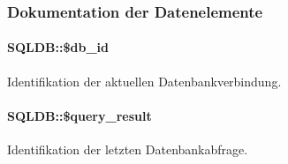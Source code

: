 \subsubsection{Dokumentation der Datenelemente}
\hypertarget{classSQLDB_2c62843044a6ec53ad3384fb36aa811b}{
\paragraph[\$db\_\-id]{\setlength{\rightskip}{0pt plus 5cm}SQLDB::\$db\_\-id}\hfill}
\label{classSQLDB_2c62843044a6ec53ad3384fb36aa811b}


Identifikation der aktuellen Datenbankverbindung. 

\hypertarget{classSQLDB_879fa41a3df6664f4ce83960808326ab}{
\paragraph[\$query\_\-result]{\setlength{\rightskip}{0pt plus 5cm}SQLDB::\$query\_\-result}\hfill}
\label{classSQLDB_879fa41a3df6664f4ce83960808326ab}


Identifikation der letzten Datenbankabfrage. 

